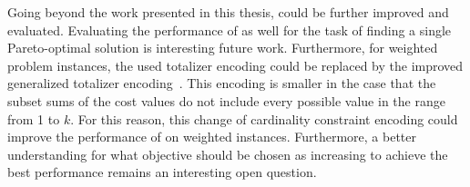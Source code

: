 Going beyond the work presented in this thesis, \algname{} could be further improved and evaluated.
Evaluating the performance of \algname{} as well for the task of finding a single Pareto-optimal solution is interesting future work.
Furthermore, for weighted problem instances, the used totalizer encoding could be replaced by the improved generalized totalizer encoding~\autocite{}.
This encoding is smaller in the case that the subset sums of the cost values do not include every possible value in the range from 1 to $k$.
For this reason, this change of cardinality constraint encoding could improve the performance of \algname{} on weighted instances.
Furthermore, a better understanding for what objective should be chosen as increasing to achieve the best performance remains an interesting open question.